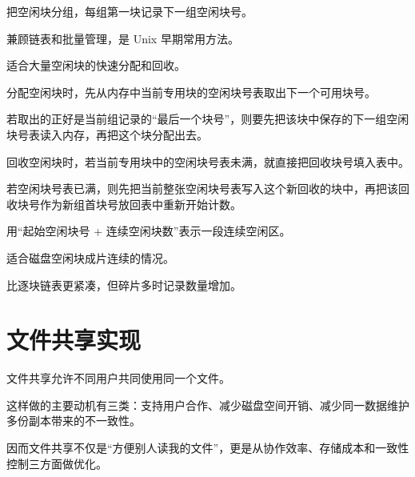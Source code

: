 \begin{points}
  \item 把空闲块分组，每组第一块记录下一组空闲块号。
  \item 兼顾链表和批量管理，是 Unix 早期常用方法。
  \item 适合大量空闲块的快速分配和回收。
\end{points}


\begin{points}
  \item 分配空闲块时，先从内存中当前专用块的空闲块号表取出下一个可用块号。
  \item 若取出的正好是当前组记录的“最后一个块号”，则要先把该块中保存的下一组空闲块号表读入内存，再把这个块分配出去。
  \item 回收空闲块时，若当前专用块中的空闲块号表未满，就直接把回收块号填入表中。
  \item 若空闲块号表已满，则先把当前整张空闲块号表写入这个新回收的块中，再把该回收块号作为新组首块号放回表中重新开始计数。
\end{points}


\begin{points}
  \item 用“起始空闲块号 + 连续空闲块数”表示一段连续空闲区。
  \item 适合磁盘空闲块成片连续的情况。
  \item 比逐块链表更紧凑，但碎片多时记录数量增加。
\end{points}


\section{文件共享实现}
\begin{points}
  \item 文件共享允许不同用户共同使用同一个文件。
  \item 这样做的主要动机有三类：支持用户合作、减少磁盘空间开销、减少同一数据维护多份副本带来的不一致性。
  \item 因而文件共享不仅是“方便别人读我的文件”，更是从协作效率、存储成本和一致性控制三方面做优化。
\end{points}



